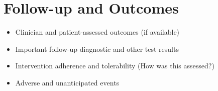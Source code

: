 
\section{Follow-up and Outcomes}
\begin{itemize}
    \item Clinician and patient-assessed outcomes (if available)
    \item Important follow-up diagnostic and other test results
    \item Intervention adherence and tolerability (How was this assessed?)
    \item Adverse and unanticipated events

\end{itemize}
